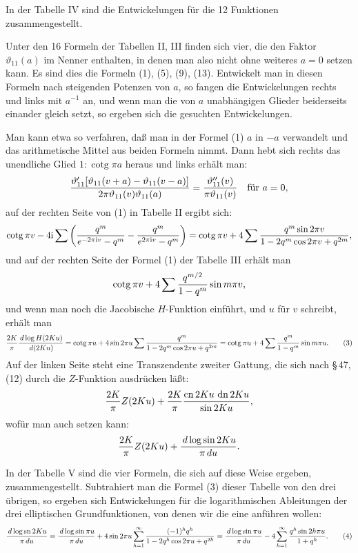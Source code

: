 \documentclass[11pt]{article}
\providecommand{\dd}{\,d}
\providecommand{\tht}{\vartheta}
\providecommand{\sn}{\operatorname{sn}}
\providecommand{\cn}{\operatorname{cn}}
\providecommand{\dn}{\operatorname{dn}}
\providecommand{\ctg}{\operatorname{cotg}}
\providecommand{\ii}{\mathrm{i}}
\begin{document}
In der Tabelle IV sind die Entwickelungen für die 12 Funktionen zusammengestellt.

Unter den 16 Formeln der Tabellen II, III finden sich vier, die den Faktor $\vartheta_{11}(a)$ im Nenner enthalten, in denen man also nicht ohne weiteres $a=0$ setzen kann. Es sind dies die Formeln (1), (5), (9), (13). Entwickelt man in diesen Formeln nach steigenden Potenzen von $a$, so fangen die Entwickelungen rechts und links mit $a^{-1}$ an, und wenn man die von $a$ unabhängigen Glieder beiderseits einander gleich setzt, so ergeben sich die gesuchten Entwickelungen.

Man kann etwa so verfahren, daß man in der Formel (1) $a$ in $-a$ verwandelt und das arithmetische Mittel aus beiden Formeln nimmt. Dann hebt sich rechts das unendliche Glied $1:\ctg\pi a$ heraus und links erhält man:
\[
{\tht'_{11}[\tht_{11}(v+a)-\tht_{11}(v-a)]\over2\pi\tht_{11}(v)\tht_{11}(a)}
={\tht''_{11}(v)\over\pi\tht_{11}(v)}\quad\text{für }a=0,
\]
auf der rechten Seite von (1) in Tabelle II ergibt sich:
\[
\ctg\pi v-4\ii\sum\left({q^m\over e^{-2\pi\ii v}-q^m}-{q^m\over e^{2\pi\ii v}-q^m}\right)
=\ctg\pi v+4\sum {q^m\sin2\pi v\over1-2q^m\cos2\pi v+q^{2m}},
\]
und auf der rechten Seite der Formel (1) der Tabelle III erhält man
\[
\ctg\pi v+4\sum {q^{m/2}\over1-q^m}\sin m\pi v,
\]
und wenn man noch die Jacobische $H$-Funktion einführt, und $u$ für $v$ schreibt, erhält man
\begin{equation}
{2K\over\pi}{\dd\log H(2Ku)\over\dd(2Ku)}
=\ctg\pi u+4\sin2\pi u\sum {q^m\over1-2q^m\cos2\pi u+q^{2m}}
=\ctg\pi u+4\sum {q^m\over1-q^m}\sin m\pi u.
\tag{3}
\end{equation}
Auf der linken Seite steht eine Transzendente zweiter Gattung, die sich nach \S\,47, (12) durch die $Z$-Funktion ausdrücken läßt:
\[
{2K\over\pi}Z(2Ku)+{2K\over\pi}{\cn2Ku\,\dn2Ku\over\sin2Ku},
\]
wofür man auch setzen kann:
\[
{2K\over\pi}Z(2Ku)+{\dd\log\sin2Ku\over\pi\dd u}.
\]

In der Tabelle V sind die vier Formeln, die sich auf diese Weise ergeben, zusammengestellt. Subtrahiert man die Formel (3) dieser Tabelle von den drei übrigen, so ergeben sich Entwickelungen für die logarithmischen Ableitungen der drei elliptischen Grundfunktionen, von denen wir die eine anführen wollen:
\begin{equation}
{\dd\log\sn2Ku\over\pi\dd u}
={\dd\log\sin\pi u\over\pi\dd u}
+4\sin2\pi u\sum_{h=1}^{\infty}{(-1)^h q^h\over1-2q^h\cos2\pi u+q^{2h}}
={\dd\log\sin\pi u\over\pi\dd u}-4\sum_{h=1}^{\infty}{q^h\sin2h\pi u\over1+q^h}.
\tag{4}
\end{equation}
\end{document}
